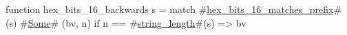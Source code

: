 function hex_bits_16_backwards s =
  match #\hyperref[sailRISCVzhexzybitszy16zymatcheszyprefix]{hex\_bits\_16\_matches\_prefix}#(s) {
      #\hyperref[sailRISCVzSome]{Some}# (bv, n) if n == #\hyperref[sailRISCVzstringzylength]{string\_length}#(s) => bv
  }
